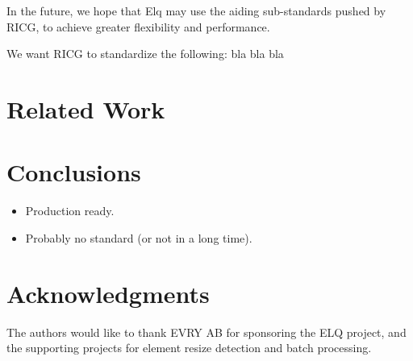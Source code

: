 \documentclass{acm_proc_article-sp}
\newcommand{\elq}{ELQ}
\begin{document}
    In the future, we hope that Elq may use the aiding sub-standards pushed by RICG, to achieve greater flexibility and performance.

    We want RICG to standardize the following: bla bla bla

\section{Related Work}
  

\section{Conclusions}
  \begin{itemize}
    \item Production ready.
    \item Probably no standard (or not in a long time).
  \end{itemize}


\section{Acknowledgments}
The authors would like to thank EVRY AB for sponsoring the \elq{} project, and the supporting projects for element resize detection and batch processing.

%

%
%
\end{document}
